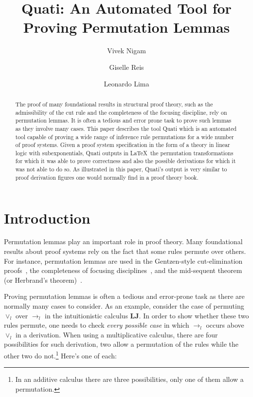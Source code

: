 \documentclass{llncs}
\title{Quati: An Automated Tool for Proving Permutation Lemmas}
\author{Vivek Nigam\inst{1} \and Giselle Reis\inst{2} \and Leonardo Lima\inst{1}}
\institute{Universidade Federal da Para\'{i}ba, Brazil
\and Technische Universit\"{a}t Wien, Austria
}
\begin{document}
\maketitle

\begin{abstract}
The proof of many foundational results in structural proof theory, such as the
admissibility of the cut rule and the completeness of the focusing discipline,
rely on permutation lemmas. It is often a tedious and error prone task to prove
such lemmas as they involve many cases. This paper describes the tool Quati
which is an automated tool capable of proving a wide range of inference rule
permutations for a wide number of proof systems. Given a proof system
specification in the form of a theory in linear logic with subexponentials,
Quati outputs in \LaTeX\ the permutation transformations for which it was able
to prove correctness and also the 
possible derivations for which it was not able to do so. As illustrated in this
paper, Quati's output is very similar to proof derivation figures one would
normally find in a proof theory book. 
\end{abstract}

\section{Introduction}

Permutation lemmas play an important role in proof theory. Many foundational
results about proof systems rely on the fact that some rules
permute over others. For instance, permutation lemmas are used in the Gentzen-style 
cut-elimination proofs~\cite{gentzen}, the completeness of focusing disciplines~\cite{andreoli,miller}, 
and the mid-sequent theorem (or Herbrand's theorem)~\cite{herbrand}.

Proving permutation lemmas is often a tedious and error-prone task as there are normally many 
cases to consider. As an example, consider the case of permuting $\vee_l$ over $\rightarrow_l$ in
the intuitionistic calculus \textbf{LJ}. In order to show whether these two
rules permute, one needs to check \emph{every possible case} in which
$\rightarrow_l$ occurs above $\vee_l$ in a derivation. When using a
multiplicative calculus, there are four possibilities for such derivation, two
allow a permutation of the rules while the other two do not.\footnote{In an
additive calculus there are three possibilities, only one of them allow a
permutation.} Here's one of each:
\vspace{-4mm}
\end{document}
